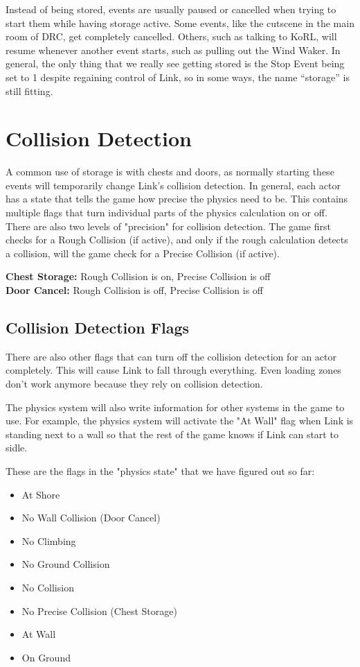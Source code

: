 \documentclass[titlepage,12pt,a4paper]{article}
\let\stdsection\section
\renewcommand\section{\newpage\stdsection}
\begin{document}
Instead of being stored, events are usually paused or cancelled when trying to start them while having storage active. Some events, like the cutscene in the main room of DRC, get completely cancelled. Others, such as talking to KoRL, will resume whenever another event starts, such as pulling out the Wind Waker. In general, the only thing that we really see getting stored is the Stop Event being set to 1 despite regaining control of Link, so in some ways, the name “storage” is still fitting.

\section{Collision Detection}
A common use of storage is with chests and doors, as normally starting these events will temporarily change Link’s collision detection. In general, each actor has a state that tells the game how precise the physics need to be. This contains multiple flags that turn individual parts of the physics calculation on or off. There are also two levels of "precision" for collision detection. The game first checks for a Rough Collision (if active), and only if the rough calculation detects a collision, will the game check for a Precise Collision (if active). 

\textbf{Chest Storage:} Rough Collision is on, Precise Collision is off\\
\textbf{Door Cancel:} Rough Collision is off, Precise Collision is off

\subsection{Collision Detection Flags}
There are also other flags that can turn off the collision detection for an actor completely. This will cause Link to fall through everything. Even loading zones don’t work anymore because they rely on collision detection.

The physics system will also write information for other systems in the game to use. For example, the physics system will activate the "At Wall" flag when Link is standing next to a wall so that the rest of the game knows if Link can start to sidle.

These are the flags in the "physics state" that we have figured out so far:
\begin{itemize}
	\item At Shore
	\item No Wall Collision (Door Cancel)
	\item No Climbing
	\item No Ground Collision
	\item No Collision
	\item No Precise Collision (Chest Storage)
	\item At Wall
	\item On Ground
\end{itemize}
\end{document}
